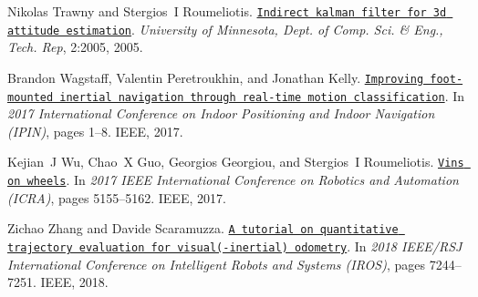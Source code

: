 \begin{DoxyDescription}
\item[\label{_CITEREF_Trawny2005TR}%
\mbox{[}22\mbox{]}]Nikolas Trawny and Stergios~I Roumeliotis. \href{http://mars.cs.umn.edu/tr/reports/Trawny05b.pdf}{\tt Indirect kalman filter for 3d attitude estimation}. {\itshape University of Minnesota, Dept. of Comp. Sci. \& Eng., Tech. Rep}, 2\+:2005, 2005.


\item[\label{_CITEREF_Wagstaff2017IPIN}%
\mbox{[}23\mbox{]}]Brandon Wagstaff, Valentin Peretroukhin, and Jonathan Kelly. \href{https://arxiv.org/pdf/1707.01152.pdf}{\tt Improving foot-\/mounted inertial navigation through real-\/time motion classification}. In {\itshape 2017 International Conference on Indoor Positioning and Indoor Navigation (I\+P\+IN)}, pages 1--8. I\+E\+EE, 2017.


\item[\label{_CITEREF_Wu2017ICRA}%
\mbox{[}24\mbox{]}]Kejian~J Wu, Chao~X Guo, Georgios Georgiou, and Stergios~I Roumeliotis. \href{http://mars.cs.umn.edu/papers/KejianWu_VINSonWheels.pdf}{\tt Vins on wheels}. In {\itshape 2017 I\+E\+EE International Conference on Robotics and Automation (I\+C\+RA)}, pages 5155--5162. I\+E\+EE, 2017.


\item[\label{_CITEREF_Zhang2018IROS}%
\mbox{[}25\mbox{]}]Zichao Zhang and Davide Scaramuzza. \href{http://rpg.ifi.uzh.ch/docs/IROS18_Zhang.pdf}{\tt A tutorial on quantitative trajectory evaluation for visual(-\/inertial) odometry}. In {\itshape 2018 I\+E\+E\+E/\+R\+SJ International Conference on Intelligent Robots and Systems (I\+R\+OS)}, pages 7244--7251. I\+E\+EE, 2018.


\end{DoxyDescription}